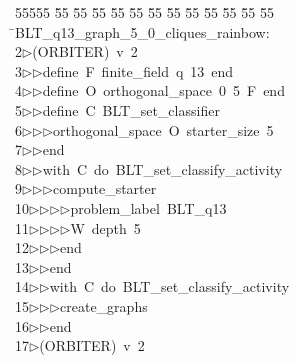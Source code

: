 %
%
\begin{tabbing}
55555 \= 55 \= 55 \= 55 \= 55 \= 55 \= 55 \= 55 \= 55 \= 55 \= 55 \= 55 \= 55 \= \>BLT\_q13\_graph\_5\_0\_cliques\_rainbow:\\[0pt]
2\>$\triangleright$\>(ORBITER)\ v\ 2\ \\[0pt]
3\>$\triangleright$\>$\triangleright$\>define\ F\ finite\_field\ q\ 13\ end\ \\[0pt]
4\>$\triangleright$\>$\triangleright$\>define\ O\ orthogonal\_space\ 0\ 5\ F\ end\ \\[0pt]
5\>$\triangleright$\>$\triangleright$\>define\ C\ BLT\_set\_classifier\ \\[0pt]
6\>$\triangleright$\>$\triangleright$\>$\triangleright$\>orthogonal\_space\ O\ starter\_size\ 5\ \\[0pt]
7\>$\triangleright$\>$\triangleright$\>end\ \\[0pt]
8\>$\triangleright$\>$\triangleright$\>with\ C\ do\ BLT\_set\_classify\_activity\ \\[0pt]
9\>$\triangleright$\>$\triangleright$\>$\triangleright$\>compute\_starter\ \\[0pt]
10\>$\triangleright$\>$\triangleright$\>$\triangleright$\>$\triangleright$\>problem\_label\ BLT\_q13\ \\[0pt]
11\>$\triangleright$\>$\triangleright$\>$\triangleright$\>$\triangleright$\>W\ depth\ 5\ \\[0pt]
12\>$\triangleright$\>$\triangleright$\>$\triangleright$\>end\ \\[0pt]
13\>$\triangleright$\>$\triangleright$\>end\ \\[0pt]
14\>$\triangleright$\>$\triangleright$\>with\ C\ do\ BLT\_set\_classify\_activity\ \\[0pt]
15\>$\triangleright$\>$\triangleright$\>$\triangleright$\>create\_graphs\ \\[0pt]
16\>$\triangleright$\>$\triangleright$\>end\\[0pt]
17\>$\triangleright$\>(ORBITER)\ v\ 2\ \\[0pt]

\end{tabbing}
